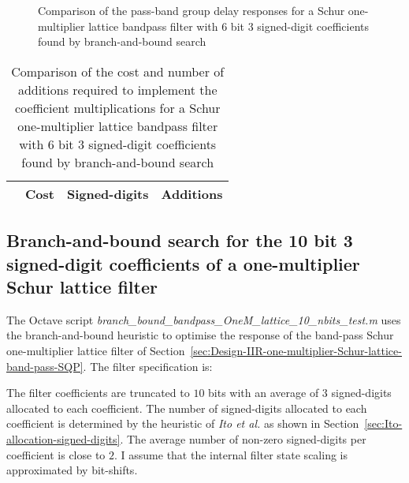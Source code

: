 \documentclass[a4paper,twoside,10pt,english]{report}
\begin{document}
\begin{figure}[!htbp]
\begin{center}
\scalebox{0.7}{}
\caption{Comparison of the pass-band group delay responses for a Schur
  one-multiplier lattice bandpass filter with 6 bit 3 signed-digit 
  coefficients found by branch-and-bound search}
\label{fig:branch-bound-schurOneMlattice-bandpass-6-nbits-delay-response}
\end{center}
\end{figure}

\begin{table}[htb]
\centering
\begin{threeparttable}
\begin{tabular}{lccc}  \\ \toprule
& Cost&Signed-digits&Additions\\ \midrule

\bottomrule
\end{tabular}
\end{threeparttable}
\caption[Summary of cost results for the Schur one-multiplier lattice 
bandpass filter branch-and-bound algorithm example with 6 bit coefficients]
{Comparison of the cost and number of additions required to implement the
  coefficient multiplications for a Schur one-multiplier lattice bandpass filter
  with 6 bit 3 signed-digit coefficients found by branch-and-bound search}
\label{tab:branch-bound-schurOneMlattice-bandpass-6-nbits-cost-summary}
\end{table}
\clearpage
\subsection{\label{sec:Branch-and-bound-search-10-bit-3-sd-one-mult-Schur-lattice}Branch-and-bound search for the 10 bit 3 signed-digit
coefficients of a one-multiplier Schur lattice filter}
The Octave script 
\emph{branch\_bound\_bandpass\_OneM\_lattice\_10\_nbits\_test.m}
uses the branch-and-bound heuristic to optimise the response of the band-pass 
Schur one-multiplier lattice filter of
Section~\ref{sec:Design-IIR-one-multiplier-Schur-lattice-band-pass-SQP}.
The filter specification is:
\begin{small}

\end{small}
The filter coefficients are truncated to $10$ bits with an average of $3$ 
signed-digits allocated to each coefficient. The number of signed-digits 
allocated to each coefficient is determined by the heuristic of 
\emph{Ito et al.} as shown in Section~\ref{sec:Ito-allocation-signed-digits}. 
The average number of non-zero signed-digits per coefficient is close to 
$2$. I assume that the internal filter state scaling is approximated by 
bit-shifts.
\end{document}
